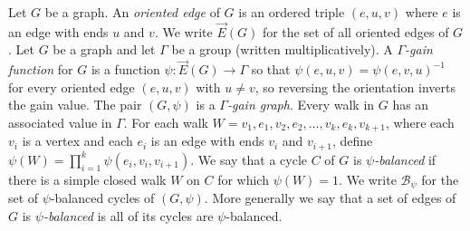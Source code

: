 \documentclass[12pt]{article}
\theoremstyle{definition}
\newcommand{\cB}{\mathcal{B}}
\begin{document}
Let $G$ be a graph.
An \emph{oriented edge} of $G$ is an ordered triple $(e,u,v)$ where $e$ is an edge with ends $u$ and $v$.
We write $\vec E(G)$ for the set of all oriented edges of $G$.
Let $G$ be a graph and let $\Gamma$ be a group (written multiplicatively).
A \emph{$\Gamma$-gain function} for $G$ is a function $\psi \colon \vec E(G) \to \Gamma$ so that $\psi(e, u, v) = \psi(e, v, u)^{-1}$ for every oriented edge $(e, u, v)$ with $u \ne v$, so reversing the orientation inverts the gain value.
The pair $(G, \psi)$ is a \emph{$\Gamma$-gain graph}.
Every walk in $G$ has an associated value in $\Gamma$.
For each walk $W = v_1, e_1, v_2, e_2, \dots, v_{k}, e_{k}, v_{k+1}$, where each $v_i$ is a vertex and each $e_i$ is an edge with ends $v_i$ and $v_{i+1}$, define $\psi(W) = \prod_{i = 1}^k \psi(e_i, v_i, v_{i+1})$.
We say that a cycle $C$ of $G$ is \emph{$\psi$-balanced} if there is a simple closed walk $W$ on $C$ for which $\psi(W) = 1$.
We write $\cB_{\psi}$ for the set of $\psi$-balanced cycles of $(G, \psi)$.
More generally we say that a set of edges of $G$ is \emph{$\psi$-balanced} is all of its cycles are $\psi$-balanced.
\end{document}
